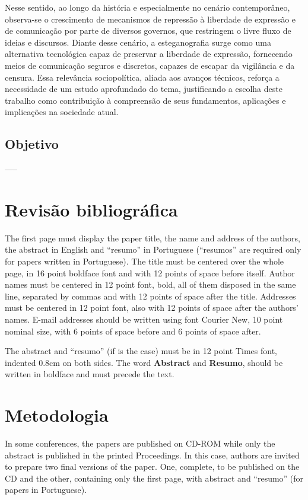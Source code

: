 \documentclass[12pt]{article}
\begin{document}
Nesse sentido, ao longo da história e especialmente no cenário contemporâneo, observa-se o crescimento de mecanismos de repressão à liberdade 
de expressão e de comunicação por parte de diversos governos, que restringem o livre fluxo de ideias e discursos. Diante desse cenário, 
a esteganografia surge como uma alternativa tecnológica capaz de preservar a liberdade de expressão, fornecendo meios de comunicação seguros 
e discretos, capazes de escapar da vigilância e da censura. Essa relevância sociopolítica, aliada aos avanços técnicos, reforça a necessidade 
de um estudo aprofundado do tema, justificando a escolha deste trabalho como contribuição à compreensão de seus fundamentos, aplicações 
e implicações na sociedade atual.


\subsection{Objetivo}

-----

\section{Revisão bibliográfica} \label{sec:firstpage}

The first page must display the paper title, the name and address of the
authors, the abstract in English and ``resumo'' in Portuguese (``resumos'' are
required only for papers written in Portuguese). The title must be centered
over the whole page, in 16 point boldface font and with 12 points of space
before itself. Author names must be centered in 12 point font, bold, all of
them disposed in the same line, separated by commas and with 12 points of
space after the title. Addresses must be centered in 12 point font, also with
12 points of space after the authors' names. E-mail addresses should be
written using font Courier New, 10 point nominal size, with 6 points of space
before and 6 points of space after.

The abstract and ``resumo'' (if is the case) must be in 12 point Times font,
indented 0.8cm on both sides. The word \textbf{Abstract} and \textbf{Resumo},
should be written in boldface and must precede the text.

\section{Metodologia}

In some conferences, the papers are published on CD-ROM while only the
abstract is published in the printed Proceedings. In this case, authors are
invited to prepare two final versions of the paper. One, complete, to be
published on the CD and the other, containing only the first page, with
abstract and ``resumo'' (for papers in Portuguese).
\end{document}
